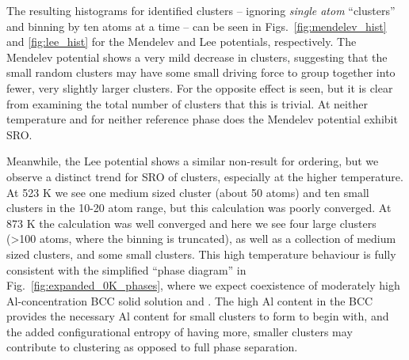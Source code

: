The resulting histograms for identified clusters -- ignoring \emph{single atom} ``clusters'' and binning by ten atoms at a time -- can be seen in Figs.~\ref{fig:mendelev_hist} and \ref{fig:lee_hist} for the Mendelev and Lee potentials, respectively.
The Mendelev potential shows a very mild decrease in \DOTHREE clusters, suggesting that the small random clusters may have some small driving force to group together into fewer, very slightly larger clusters. For \BTWO the opposite effect is seen, but it is clear from examining the total number of clusters that this is trivial.
At neither temperature and for neither reference phase does the Mendelev potential exhibit SRO.

Meanwhile, the Lee potential shows a similar non-result for \BTWO ordering, but we observe a distinct trend for SRO of \DOTHREE clusters, especially at the higher temperature.
At 523 K we see one medium sized cluster (about 50 atoms) and ten small clusters in the 10-20 atom range,
but this calculation was poorly converged.
At 873 K the calculation was well converged and here we see four large clusters (>100 atoms, where the binning is truncated), as well as a collection of medium sized clusters, and some small clusters.
This high temperature behaviour is fully consistent with the simplified ``phase diagram'' in Fig.~\ref{fig:expanded_0K_phases}, where we expect coexistence of moderately high Al-concentration BCC solid solution and \DOTHREE.
The high Al content in the BCC provides the necessary Al content for small clusters to form to begin with, and the added configurational entropy of having more, smaller clusters may contribute to clustering as opposed to full phase separation.

